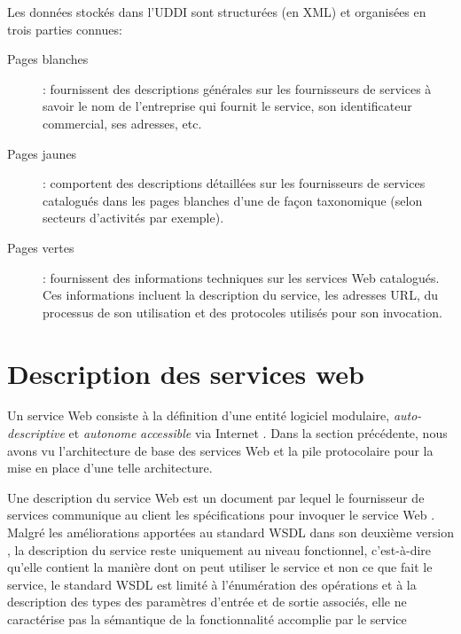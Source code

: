   Les données stockés dans l'UDDI sont structurées (en \textsc{XML})
  et organisées en trois parties connues:

  \SpecialItem
  \begin{description}
    \item[Pages blanches]: fournissent des descriptions générales sur
      les fournisseurs de services à savoir le nom de l'entreprise qui
      fournit le service, son identificateur commercial, ses adresses,
      etc.
        
    \item[Pages jaunes]: comportent des descriptions détaillées sur
      les fournisseurs de services catalogués dans les pages blanches
      d'une de façon taxonomique (selon secteurs d'activités par
      exemple).

    \item[Pages vertes]: fournissent des informations techniques sur
      les services Web catalogués. Ces informations incluent la
      description du service, les adresses \textsc{URL}, du processus
      de son utilisation et des protocoles utilisés pour son
      invocation.       
  \end{description}


\section{Description des services web}
\label{sec:ws-description}

Un service Web consiste à la définition d'une entité logiciel
modulaire, \textit{auto-descriptive} et \textit{autonome}
\textit{accessible} via Internet \cite{curbera2001web}. Dans la
section précédente, nous avons vu l'architecture de base des services
Web et la pile protocolaire pour la mise en place d'une telle
architecture.



Une description du service Web est un document par lequel le
fournisseur de services communique au client les spécifications pour
invoquer le service Web \cite{lopez2008selection}. Malgré les
améliorations apportées au standard \textsc{WSDL} dans son deuxième
version \cite{chinnici2007web}, la description du service reste
uniquement au niveau fonctionnel, c'est-à-dire qu'elle contient la
manière dont on peut utiliser le service et non ce que fait le
service, le standard \textsc{WSDL} est limité à l'énumération des
opérations et à la description des types des paramètres d'entrée et de
sortie associés, elle ne caractérise pas la sémantique de la
fonctionnalité accomplie par le service

